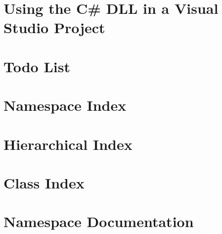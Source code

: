 \let\mypdfximage\pdfximage\def\pdfximage{\immediate\mypdfximage}\documentclass[twoside]{book}
\newcommand{\+}{\discretionary{\mbox{\scriptsize$\hookleftarrow$}}{}{}}
\begin{document}
\chapter{Using the C\# D\+LL in a Visual Studio Project}
\label{_v_s_tutorial}

\chapter{Todo List}
\label{todo}

\chapter{Namespace Index}

\chapter{Hierarchical Index}

\chapter{Class Index}

\chapter{Namespace Documentation}











\end{document}

